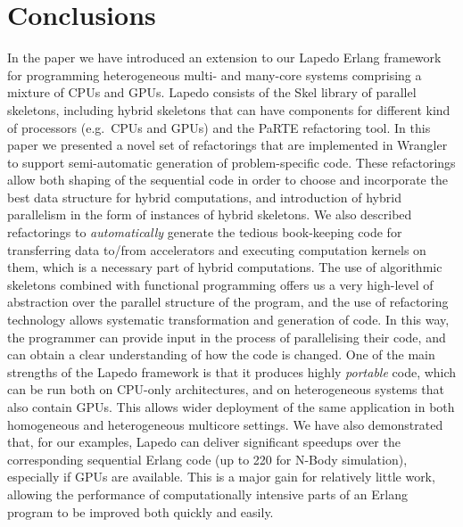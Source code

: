 \documentclass[final]{jfp1}
\newcommand{\lapedo}{\xspace{\sc Lapedo}\xspace}
\newcommand{\Lapedo}{\lapedo}
\begin{document}
\section{Conclusions}
\noindent
In the paper we have introduced an extension to our \Lapedo{} Erlang framework for
programming heterogeneous multi- and many-core systems comprising a
mixture of CPUs and GPUs. \Lapedo{} consists of the Skel library
of parallel
skeletons, including hybrid skeletons that can have components for different kind of processors (e.g.~CPUs and GPUs) and the PaRTE refactoring tool. In this paper we presented a novel set of refactorings that are implemented in Wrangler 
to support
semi-automatic generation of problem-specific code. These refactorings allow both shaping of the sequential code in order to choose and incorporate the best data structure for hybrid computations, and introduction of hybrid parallelism in the form of instances of hybrid skeletons. We also described refactorings to \emph{automatically} generate the tedious book-keeping code for transferring data to/from accelerators and executing computation kernels on them, which is a necessary part of hybrid computations. The use of
algorithmic skeletons combined with functional programming
offers us a very high-level of abstraction over the
parallel structure of the program, and the use of refactoring technology
allows systematic transformation and generation of code. In this way,
the programmer can provide input in the process of parallelising their
code, and can obtain a clear understanding of how the code is changed. 
One of the main strengths of the \Lapedo{} framework is that it produces
highly \emph{portable} code, which can be run both on CPU-only
architectures, and on heterogeneous systems that also contain GPUs. 
This allows wider deployment of the same application in both
homogeneous and heterogeneous multicore settings.
We
have also demonstrated that, for our examples, \Lapedo{} can
deliver significant speedups 
over the corresponding sequential Erlang code (up to 220 for N-Body simulation),
especially if GPUs are available.
This is a major gain for relatively little work, allowing the performance
of computationally intensive parts of an Erlang program to be improved
both quickly and easily.



\end{document}
